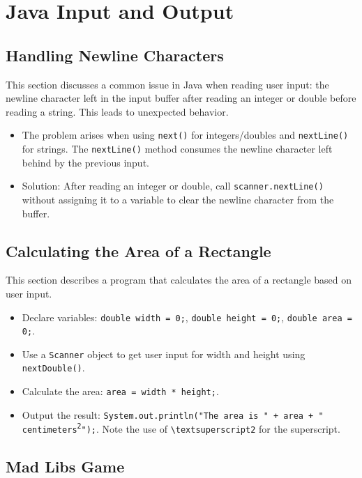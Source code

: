 \documentclass{article}
\begin{document}
\section{Java Input and Output}

\subsection{Handling Newline Characters}

This section discusses a common issue in Java when reading user input: the newline character left in the input buffer after reading an integer or double before reading a string.  This leads to unexpected behavior.

\begin{itemize}
    \item The problem arises when using \texttt{next()} for integers/doubles and \texttt{nextLine()} for strings. The \texttt{nextLine()} method consumes the newline character left behind by the previous input.
    \item Solution:  After reading an integer or double, call \texttt{scanner.nextLine()} without assigning it to a variable to clear the newline character from the buffer.
\end{itemize}

\subsection{Calculating the Area of a Rectangle}

This section describes a program that calculates the area of a rectangle based on user input.

\begin{itemize}
    \item Declare variables: \texttt{double width = 0;}, \texttt{double height = 0;}, \texttt{double area = 0;}.
    \item Use a \texttt{Scanner} object to get user input for width and height using \texttt{nextDouble()}.
    \item Calculate the area: \texttt{area = width * height;}.
    \item Output the result: \texttt{System.out.println("The area is " + area + " centimeters\textsuperscript{2}");}.  Note the use of \texttt{\textbackslash{}textsuperscript{2}} for the superscript.
\end{itemize}

\subsection{Mad Libs Game}
\end{document}
